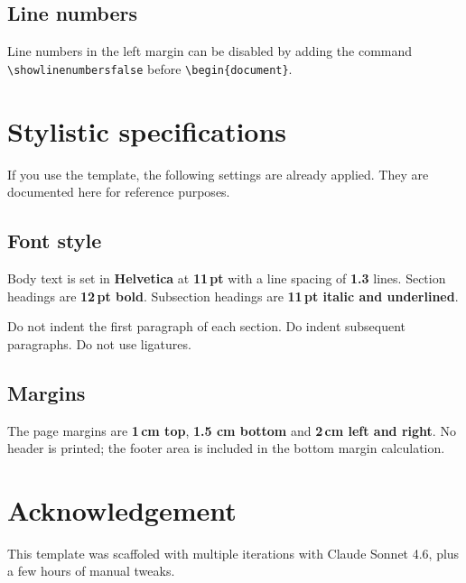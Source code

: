 \documentclass{writtenassignmentchat}
\begin{document}
\subsection{Line numbers}

Line numbers in the left margin can be disabled by adding the command \verb|\showlinenumbersfalse| before  \verb|\begin{document}|.

\section{Stylistic specifications}
If you use the template, the following settings are already applied. They are documented here for reference purposes.

\subsection{Font style}

Body text is set in \textbf{Helvetica} at \textbf{11\,pt} with a
line spacing of \textbf{1.3} lines.
Section headings are \textbf{12\,pt bold}.
Subsection headings are \textbf{11\,pt italic and underlined}. 

Do not indent the first paragraph of each section. Do indent subsequent paragraphs. Do not use ligatures.

\subsection{Margins}

The page margins are \textbf{1\,cm top}, \textbf{1.5 cm bottom} and \textbf{2\,cm left and
right}. No header is printed; the footer
area is included in the bottom margin calculation.

\section{Acknowledgement}
This template was scaffoled with multiple iterations with Claude Sonnet 4.6, plus a few hours of manual tweaks.

\end{document}
